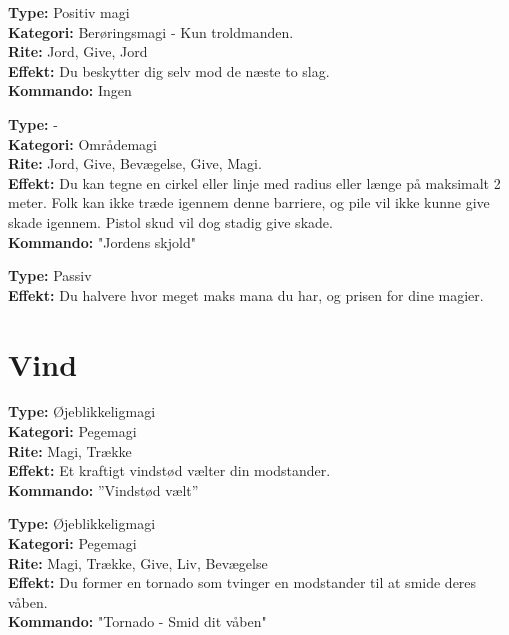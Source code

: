 \begin{jord*}[Jordensrustning]
\textbf{Type:} Positiv magi\\
\textbf{Kategori:} Berøringsmagi - Kun troldmanden.\\
\textbf{Rite:} Jord, Give, Jord\\
\textbf{Effekt:} Du beskytter dig selv mod de næste to slag.\\
\textbf{Kommando:} Ingen
\end{jord*}

\begin{jord*}
\textbf{Type:} -\\
\textbf{Kategori:} Områdemagi \\
\textbf{Rite:} Jord, Give, Bevægelse, Give, Magi.\\
\textbf{Effekt:} Du kan tegne en cirkel eller linje med radius eller længe på maksimalt 2 meter. Folk kan ikke træde igennem denne barriere, og pile vil ikke kunne give skade igennem. Pistol skud vil dog stadig give skade.\\
\textbf{Kommando:} "Jordens skjold"
\end{jord*}

\begin{jord*}
\textbf{Type:} Passiv\\
\textbf{Effekt:} Du halvere hvor meget maks mana du har, og prisen for dine magier.
\end{jord*}

\section{Vind}
\begin{vind*}[Vindstød]
\textbf{Type:} Øjeblikkeligmagi\\
\textbf{Kategori:} Pegemagi\\
\textbf{Rite:} Magi, Trække\\
\textbf{Effekt:} Et kraftigt vindstød vælter din modstander.\\ 
\textbf{Kommando:} ”Vindstød vælt”\\
\end{vind*}

\begin{vind*}[Tornado]
\textbf{Type:} Øjeblikkeligmagi\\
\textbf{Kategori:} Pegemagi\\
\textbf{Rite:} Magi, Trække, Give, Liv, Bevægelse\\
\textbf{Effekt:} Du former en tornado som tvinger en modstander til at smide deres våben.\\
\textbf{Kommando:} "Tornado - Smid dit våben"
\end{vind*}

